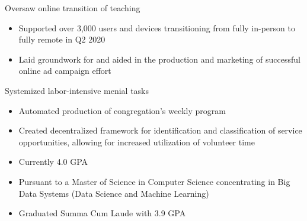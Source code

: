 \par\smallskip
\begin{minipage}{13.75cm}
  \begin{minipage}{6.5cm}
    Oversaw online transition of teaching
    \begin{itemize}
      \item Supported over 3,000 users and devices transitioning from fully in-person to fully remote in Q2 2020
      \item Laid groundwork for and aided in the production and marketing of successful online ad campaign effort
    \end{itemize}
  \end{minipage}
  \hfill
  \begin{minipage}{6.5cm}
    Systemized labor-intensive menial tasks
    \begin{itemize}
      \item Automated production of congregation’s weekly program
      \item Created decentralized framework for identification and classification of service opportunities, allowing for increased utilization of volunteer time
    \end{itemize}
  \end{minipage}
\end{minipage}

\begin{itemize}
  \item Currently 4.0 GPA
  \item Pursuant to a Master of Science in Computer Science concentrating in Big Data Systems (Data Science and Machine Learning)
\end{itemize}
\divider

\begin{itemize}
  \item Graduated Summa Cum Laude with 3.9 GPA
\end{itemize}

